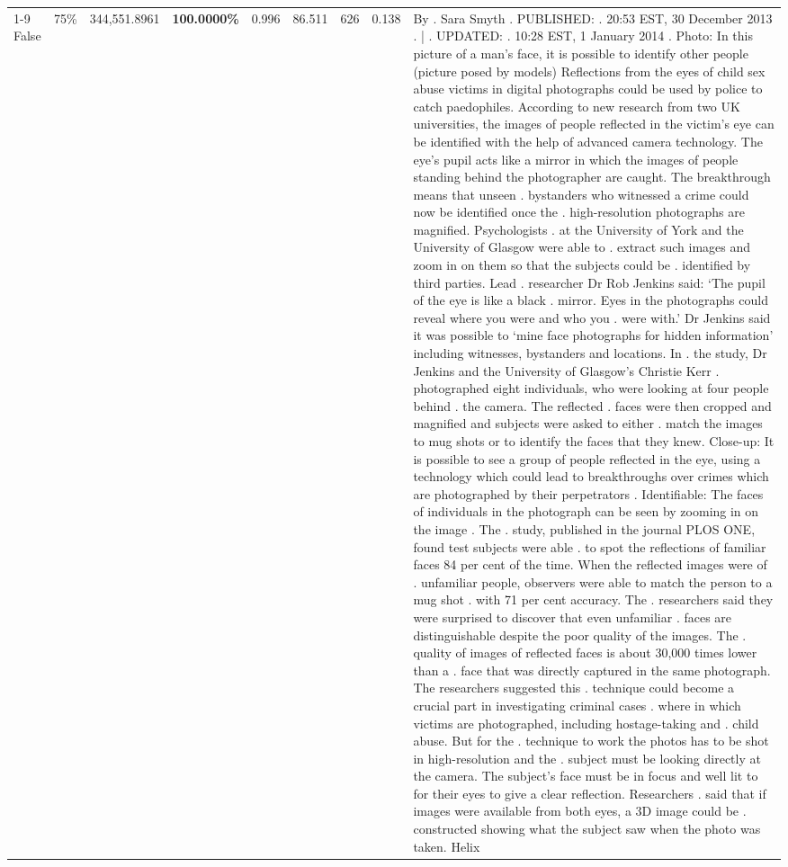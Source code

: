 \begin{table}[H]
\begin{tabular}{lllrlllll}
\cline{1-9} \cline{2-9}
False & 75\% & 344,551.8961 & \bfseries \color{red} 100.0000\% & 0.996 & 86.511 & 626 & 0.138 & By . Sara Smyth . PUBLISHED: . 20:53 EST, 30 December 2013 . | . UPDATED: . 10:28 EST, 1 January 2014 . Photo: In this picture of a man's face, it is possible to identify other people (picture posed by models) Reflections from the eyes of child sex abuse victims in digital photographs could be used by police to catch paedophiles. According to new research from two UK universities, the images of people reflected in the victim's eye can be identified with the help of advanced camera technology. The eye's pupil acts like a mirror in which the images of people standing behind the photographer are caught. The breakthrough means that unseen . bystanders who witnessed a crime could now be identified once the . high-resolution photographs are magnified. Psychologists . at the University of York and the University of Glasgow were able to . extract such images and zoom in on them so that the subjects could be . identified by third parties. Lead . researcher Dr Rob Jenkins said: ‘The pupil of the eye is like a black . mirror. Eyes in the photographs could reveal where you were and who you . were with.' Dr Jenkins said it was possible to ‘mine face photographs for hidden information' including witnesses, bystanders and locations. In . the study, Dr Jenkins and the University of Glasgow's Christie Kerr . photographed eight individuals, who were looking at four people behind . the camera. The reflected . faces were then cropped and magnified and subjects were asked to either . match the images to mug shots or to identify the faces that they knew. Close-up: It is possible to see a group of people reflected in the eye, using a technology which could lead to breakthroughs over crimes which are photographed by their perpetrators . Identifiable: The faces of individuals in the photograph can be seen by zooming in on the image . The . study, published in the journal PLOS ONE, found test subjects were able . to spot the reflections of familiar faces 84 per cent of the time. When the reflected images were of . unfamiliar people, observers were able to match the person to a mug shot . with 71 per cent accuracy. The . researchers said they were surprised to discover that even unfamiliar . faces are distinguishable despite the poor quality of the images. The . quality of images of reflected faces is about 30,000 times lower than a . face that was directly captured in the same photograph. The researchers suggested this . technique could become a crucial part in investigating criminal cases . where in which victims are photographed, including hostage-taking and . child abuse. But for the . technique to work the photos has to be shot in high-resolution and the . subject must be looking directly at the camera. The subject's face must be in focus and well lit to for their eyes to give a clear reflection. Researchers . said that if images were available from both eyes, a 3D image could be . constructed showing what the subject saw when the photo was taken. Helix \\

\end{tabular}
\end{table}
